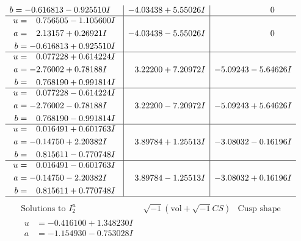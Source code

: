 \documentclass[1p]{elsarticle_modified}
\theoremstyle{definition}
\newcommand{\I}{\sqrt{-1}}
\begin{document}
$$\begin{array}{c|c|c}
\begin{aligned}
b &= -0.616813 - 0.925510 I\end{aligned}
 & -4.03438 + 5.55026 I & \phantom{-0.000000 } 0 \\ \hline\begin{aligned}
u &= \phantom{-}0.756505 - 1.105600 I \\
a &= \phantom{-}2.13157 + 0.26921 I \\
b &= -0.616813 + 0.925510 I\end{aligned}
 & -4.03438 - 5.55026 I & \phantom{-0.000000 } 0 \\ \hline\begin{aligned}
u &= \phantom{-}0.077228 + 0.614224 I \\
a &= -2.76002 + 0.78188 I \\
b &= \phantom{-}0.768190 + 0.991814 I\end{aligned}
 & \phantom{-}3.22200 + 7.20972 I & -5.09243 - 5.64626 I \\ \hline\begin{aligned}
u &= \phantom{-}0.077228 - 0.614224 I \\
a &= -2.76002 - 0.78188 I \\
b &= \phantom{-}0.768190 - 0.991814 I\end{aligned}
 & \phantom{-}3.22200 - 7.20972 I & -5.09243 + 5.64626 I \\ \hline\begin{aligned}
u &= \phantom{-}0.016491 + 0.601763 I \\
a &= -0.14750 + 2.20382 I \\
b &= \phantom{-}0.815611 - 0.770748 I\end{aligned}
 & \phantom{-}3.89784 + 1.25513 I & -3.08032 - 0.16196 I \\ \hline\begin{aligned}
u &= \phantom{-}0.016491 - 0.601763 I \\
a &= -0.14750 - 2.20382 I \\
b &= \phantom{-}0.815611 + 0.770748 I\end{aligned}
 & \phantom{-}3.89784 - 1.25513 I & -3.08032 + 0.16196 I\\
 \hline 
 \end{array}$$\newpage$$\begin{array}{c|c|c}  
\text{Solutions to }I^u_{2}& \I (\text{vol} + \sqrt{-1}CS) & \text{Cusp shape}\\
 \hline 
\begin{aligned}
u &= -0.416100 + 1.348230 I \\
a &= -1.154930 - 0.753028 I \\

\end{aligned}
\end{array}$$
\end{document}
